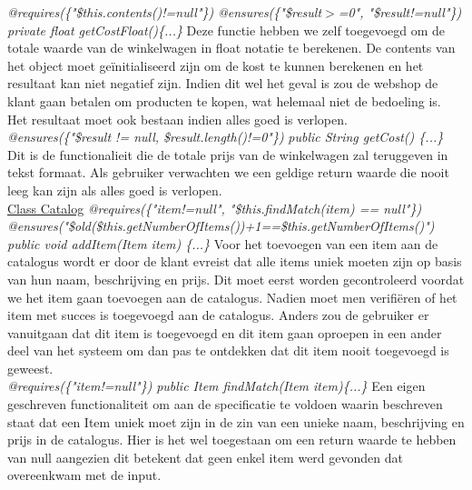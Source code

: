 \documentclass{article}
\begin{document}
\noindent
\textit{@requires(\{"\$this.contents()!=null"\})}\newline
\textit{@ensures(\{"\$result$>$=0", "\$result!=null"\})}\newline
\textit{private float getCostFloat()\{...\}}\newline
Deze functie hebben we zelf toegevoegd om de totale waarde van de winkelwagen in float notatie te berekenen. De contents van het object moet geïnitialiseerd zijn om de kost te kunnen berekenen en het resultaat kan niet negatief zijn. Indien dit wel het geval is zou de webshop de klant gaan betalen om producten te kopen, wat helemaal niet de bedoeling is. Het resultaat moet ook bestaan indien alles goed is verlopen.\\

\noindent
\textit{@ensures(\{"\$result != null, \$result.length()!=0"\})}\newline
\textit{public String getCost() \{...\}}\newline
Dit is de functionalieit die de totale prijs van de winkelwagen zal teruggeven in tekst formaat. Als gebruiker verwachten we een geldige return waarde die nooit leeg kan zijn als alles goed is verlopen.\\

\noindent
\underline{Class Catalog}\newline
\textit{@requires(\{"item!=null", "\$this.findMatch(item) == null"\})}\newline
\textit{@ensures("\$old(\$this.getNumberOfItems())+1==\$this.getNumberOfItems()")}\newline
\textit{public void addItem(Item item) \{...\}}\newline
Voor het toevoegen van een item aan de catalogus wordt er door de klant evreist dat alle items uniek moeten zijn op basis van hun naam, beschrijving en prijs. Dit moet eerst worden gecontroleerd voordat we het item gaan toevoegen aan de catalogus. Nadien moet men verifi\"{e}ren of het item met succes is toegevoegd aan de catalogus. Anders zou de gebruiker er vanuitgaan dat dit item is toegevoegd en dit item gaan oproepen in een ander deel van het systeem om dan pas te ontdekken dat dit item nooit toegevoegd is geweest.\\

\noindent
\textit{@requires(\{"item!=null"\})}\newline
\textit{public Item findMatch(Item item)\{...\}}\newline
Een eigen geschreven functionaliteit om aan de specificatie te voldoen waarin beschreven staat dat een Item uniek moet zijn in de zin van een unieke naam, beschrijving en prijs in de catalogus. Hier is het wel toegestaan om een return waarde te hebben van null aangezien dit betekent dat geen enkel item werd gevonden dat overeenkwam met de input. \\
\end{document}
